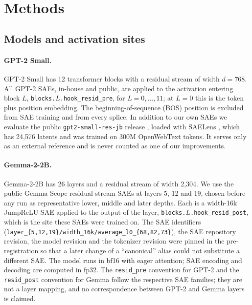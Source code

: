 \section{Methods}\label{sec:methods}



\subsection{Models and activation sites}\label{sec:models}

\paragraph{GPT-2 Small.} GPT-2 Small has 12 transformer blocks with a residual stream of width $d=768$. All GPT-2
SAEs, in-house and public, are applied to the activation entering block $L$, \texttt{blocks.$L$.hook\_resid\_pre},
for $L=0,\dots,11$; at $L=0$ this is the token plus position embedding. The beginning-of-sequence (BOS) position is
excluded from SAE training and from every splice. In addition to our own SAEs we evaluate the public
\texttt{gpt2-small-res-jb} release \citep{bloom2024gpt2}, loaded with SAELens \citep{saelens2024}, which has 24{,}576
latents and was trained on 300M OpenWebText tokens. It serves only as an external reference and is never counted as one
of our improvements.

\paragraph{Gemma-2-2B.} Gemma-2-2B has 26 layers and a residual stream of width 2{,}304. We use the public Gemma Scope
residual-stream SAEs \citep{gemmascope2024} at layers 5, 12 and 19, chosen before any run as representative lower,
middle and later depths. Each is a width-16k JumpReLU SAE applied to the output of the layer,
\texttt{blocks.$L$.hook\_resid\_post}, which is the site these SAEs were trained on. The SAE identifiers
(\texttt{layer\_\{5,12,19\}/width\_16k/average\_l0\_\{68,82,73\}}), the SAE repository revision, the model revision
and the tokenizer revision were pinned in the pre-registration so that a later change of a ``canonical'' alias could
not substitute a different SAE. The model runs in bf16 with eager attention; SAE encoding and decoding are computed
in fp32. The \texttt{resid\_pre} convention for GPT-2 and the \texttt{resid\_post} convention for Gemma follow the
respective SAE families; they are not a layer mapping, and no correspondence between GPT-2 and Gemma layers is
claimed.

